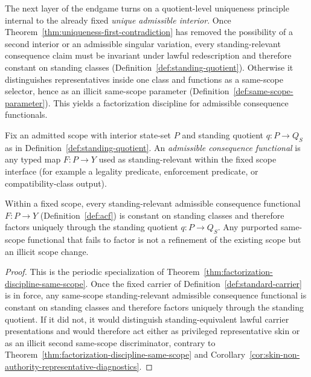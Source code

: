 The next layer of the endgame turns on a quotient-level uniqueness principle internal to the already fixed \emph{unique admissible interior}. Once Theorem~\ref{thm:uniqueness-first-contradiction} has removed the possibility of a second interior or an admissible singular variation, every standing-relevant consequence claim must be invariant under lawful redescription and therefore constant on standing classes (Definition~\ref{def:standing-quotient}). Otherwise it distinguishes representatives inside one class and functions as a same-scope selector, hence as an illicit same-scope parameter (Definition~\ref{def:same-scope-parameter}). This yields a factorization discipline for admissible consequence functionals.

\begin{definition}\label{def:acf}
Fix an admitted scope with interior state-set $P$ and standing quotient $q:P\to Q_S$ as in
Definition~\ref{def:standing-quotient}. An
\emph{admissible consequence functional} is any typed map $F:P\to Y$ used as standing-relevant
within the fixed scope interface (for example a legality predicate, enforcement predicate,
or compatibility-class output).
\end{definition}

\begin{proposition}\label{prop:factorization-discipline-NS}
Within a fixed scope, every standing-relevant admissible consequence functional $F:P\to Y$
(Definition~\ref{def:acf}) is constant on standing classes and therefore factors uniquely through the
standing quotient $q:P\to Q_S$.
Any purported same-scope functional that fails to factor is not a refinement of the existing scope
but an illicit scope change.
\end{proposition}

\begin{proof}
This is the periodic specialization of Theorem~\ref{thm:factorization-discipline-same-scope}. Once the fixed carrier of Definition~\ref{def:standard-carrier} is in force, any same-scope standing-relevant admissible consequence functional is constant on standing classes and therefore factors uniquely through the standing quotient. If it did not, it would distinguish standing-equivalent lawful carrier presentations and would therefore act either as privileged representative skin or as an illicit second same-scope discriminator, contrary to Theorem~\ref{thm:factorization-discipline-same-scope} and Corollary~\ref{cor:skin-non-authority-representative-diagnostics}.
\end{proof}

